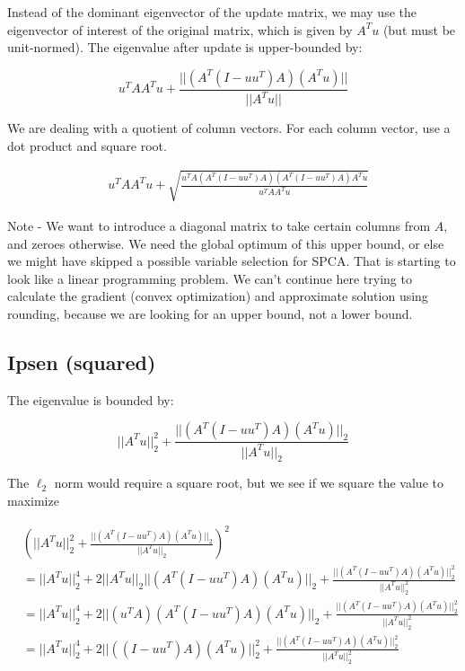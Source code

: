 \documentclass{article}
\begin{document}
Instead of the dominant eigenvector of the update matrix, we may use the eigenvector of interest of the original matrix, which is given by $A^T u$ (but must be unit-normed). The eigenvalue after update is upper-bounded by:

$$
u^T A A^T u + \frac{|| (A^T (I-uu^T) A) (A^T u) ||}{|| A^T u ||}
$$

We are dealing with a quotient of column vectors. For each column vector, use a dot product and square root.

\begin{equation*}
    \begin{aligned}
        & u^T A A^T u + \sqrt{\frac{u^T A (A^T (I-uu^T) A) (A^T (I-uu^T) A) A^T u}{u^T A A^T u}}
    \end{aligned}
\end{equation*}

Note - We want to introduce a diagonal matrix to take certain columns from $A$, and zeroes otherwise. We need the global optimum of this upper bound, or else we might have skipped a possible variable selection for SPCA. That is starting to look like a linear programming problem. We can't continue here trying to calculate the gradient (convex optimization) and approximate solution using rounding, because we are looking for an upper bound, not a lower bound.

\subsection{Ipsen (squared)}

The eigenvalue is bounded by:

$$
|| A^T u ||^2_2
+
\frac{||(A^T (I-uu^T) A) (A^T u)||_2}{||A^T u||_2}
$$

The $\ell_2$ norm would require a square root, but we see if we square the value to maximize

\begin{equation*}
    \begin{aligned}
        &\left(|| A^T u ||^2_2
        +
        \frac{||(A^T (I-uu^T) A) (A^T u)||_2}{||A^T u||_2}\right)^2
        \\
        &=
        || A^T u ||^4_2
        +
        2 || A^T u ||_2 ||(A^T (I-uu^T) A) (A^T u)||_2
        + \frac{||(A^T (I-uu^T) A) (A^T u)||^2_2}{||A^T u||^2_2}
        \\
        &=
        || A^T u ||^4_2
        +
        2 || (u^T A) (A^T (I-uu^T) A) (A^T u)||_2
        + \frac{||(A^T (I-uu^T) A) (A^T u)||^2_2}{||A^T u||^2_2}
        \\
        &=
        || A^T u ||^4_2
        +
        2 || ((I-uu^T) A) (A^T u)||^2_2
        + \frac{||(A^T (I-uu^T) A) (A^T u)||^2_2}{||A^T u||^2_2}
    \end{aligned}
\end{equation*}
\end{document}
